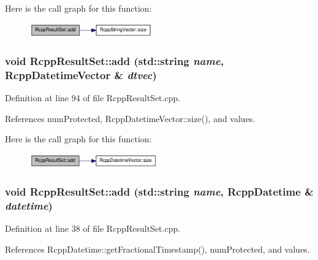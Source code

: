 Here is the call graph for this function:\nopagebreak
\begin{figure}[H]
\begin{center}
\leavevmode
\includegraphics[width=150pt]{classRcppResultSet_a10d01a24ef006c1ff14ca7e95fb9e0ea_cgraph}
\end{center}
\end{figure}
\hypertarget{classRcppResultSet_aac8cade970247a377e8dbebf1c79a86c}{
\subsubsection[{add}]{\setlength{\rightskip}{0pt plus 5cm}void RcppResultSet::add (std::string {\em name}, \/  {\bf RcppDatetimeVector} \& {\em dtvec})}}
\label{classRcppResultSet_aac8cade970247a377e8dbebf1c79a86c}


Definition at line 94 of file RcppResultSet.cpp.

References numProtected, RcppDatetimeVector::size(), and values.

Here is the call graph for this function:\nopagebreak
\begin{figure}[H]
\begin{center}
\leavevmode
\includegraphics[width=157pt]{classRcppResultSet_aac8cade970247a377e8dbebf1c79a86c_cgraph}
\end{center}
\end{figure}
\hypertarget{classRcppResultSet_a1d921e7a24e50369ae67a1bc63826131}{
\subsubsection[{add}]{\setlength{\rightskip}{0pt plus 5cm}void RcppResultSet::add (std::string {\em name}, \/  {\bf RcppDatetime} \& {\em datetime})}}
\label{classRcppResultSet_a1d921e7a24e50369ae67a1bc63826131}


Definition at line 38 of file RcppResultSet.cpp.

References RcppDatetime::getFractionalTimestamp(), numProtected, and values.

